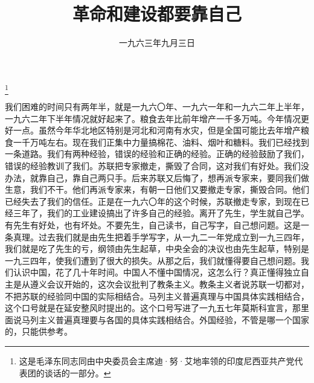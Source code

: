 
\title{革命和建设都要靠自己}
\date{一九六三年九月三日}
\thanks{这是毛泽东同志同由中央委员会主席迪·努·艾地率领的印度尼西亚共产党代表团的谈话的一部分。}
\maketitle


我们困难的时间只有两年半，就是一九六〇年、一九六一年和一九六二年上半年，一九六二年下半年情况就好起来了。粮食去年比前年增产一千多万吨。今年情况更好一点。虽然今年华北地区特别是河北和河南有水灾，但是全国可能比去年增产粮食一千万吨左右。现在我们正集中力量搞棉花、油料、烟叶和糖料。我们已经找到一条道路。我们有两种经验，错误的经验和正确的经验。正确的经验鼓励了我们，错误的经验教训了我们。苏联把专家撤走，撕毁了合同，这对我们有好处。我们没办法，就靠自己，靠自己两只手。后来苏联又后悔了，想再派专家来，要同我们做生意，我们不干。他们再派专家来，有朝一日他们又要撤走专家，撕毁合同。他们已经失去了我们的信任。正是在一九六〇年的这个时候，苏联撤走专家，到现在已经三年了，我们的工业建设搞出了许多自己的经验。离开了先生，学生就自己学。有先生有好处，也有坏处。不要先生，自己读书，自己写字，自己想问题。这是一条真理。过去我们就是由先生把着手学写字，从一九二一年党成立到一九三四年，我们就是吃了先生的亏，纲领由先生起草，中央全会的决议也由先生起草，特别是一九三四年，使我们遭到了很大的损失。从那之后，我们就懂得要自己想问题。我们认识中国，花了几十年时间。中国人不懂中国情况，这怎么行？真正懂得独立自主是从遵义会议开始的，这次会议批判了教条主义。教条主义者说苏联一切都对，不把苏联的经验同中国的实际相结合。马列主义普遍真理与中国具体实践相结合，这个口号就是在延安整风时提出的。这个口号写进了一九五七年莫斯科宣言，那里面说马列主义普遍真理要与各国的具体实践相结合。外国经验，不管是哪一个国家的，只能供参考。
